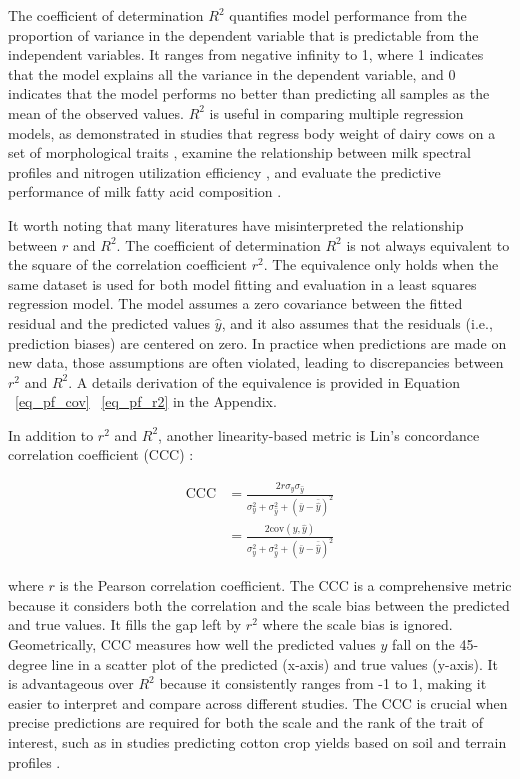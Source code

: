 The coefficient of determination \(R^2\) quantifies model performance from the proportion of variance in the dependent variable that is predictable from the independent variables. It ranges from negative infinity to 1, where 1 indicates that the model explains all the variance in the dependent variable, and 0 indicates that the model performs no better than predicting all samples as the mean of the observed values. \(R^2\) is useful in comparing multiple regression models, as demonstrated in studies that regress body weight of dairy cows on a set of morphological traits \citep{xavier_use_2022}, examine the relationship between milk spectral profiles and nitrogen utilization efficiency \citep{grelet_potential_2020}, and evaluate the predictive performance of milk fatty acid composition \citep{mantysaari_body_2019}.

It worth noting that many literatures have misinterpreted the relationship between $r$ and $R^2$. The coefficient of determination $R^2$ is not always equivalent to the square of the correlation coefficient $r^2$. The equivalence only holds when the same dataset is used for both model fitting and evaluation in a least squares regression model. The model assumes a zero covariance between the fitted residual and the predicted values $\hat{y}$, and it also assumes that the residuals (i.e., prediction biases) are centered on zero. In practice when predictions are made on new data, those assumptions are often violated, leading to discrepancies between $r^2$ and $R^2$. A details derivation of the equivalence is provided in Equation ~\ref{eq_pf_cov} ~\ref{eq_pf_r2} in the Appendix.


In addition to \(r^2\) and \(R^2\), another linearity-based metric is Lin's concordance correlation coefficient (CCC) \citep{lin_concordance_1989}:

\begin{equation} \label{eq_ccc}
\begin{aligned}
\text{CCC} &= \frac{2r \sigma_y \sigma_{\hat{y}}}{\sigma_y^2 + \sigma_{\hat{y}}^2 + (\bar{y} - \bar{\hat{y}})^2} \\
&= \frac{2 \text{cov}(y, \hat{y})}{\sigma_y^2 + \sigma_{\hat{y}}^2 + (\bar{y} - \bar{\hat{y}})^2}
\end{aligned}
\end{equation}

where $r$ is the Pearson correlation coefficient. The CCC is a comprehensive metric because it considers both the correlation and the scale bias between the predicted and true values. It fills the gap left by \(r^2\) where the scale bias is ignored. Geometrically, CCC measures how well the predicted values \(\hat{y}\) fall on the 45-degree line in a scatter plot of the predicted (x-axis) and true values (y-axis). It is advantageous over \(R^2\) because it consistently ranges from -1 to 1, making it easier to interpret and compare across different studies. The CCC is crucial when precise predictions are required for both the scale and the rank of the trait of interest, such as in studies predicting cotton crop yields based on soil and terrain profiles \citep{jones_identifying_2022}.

